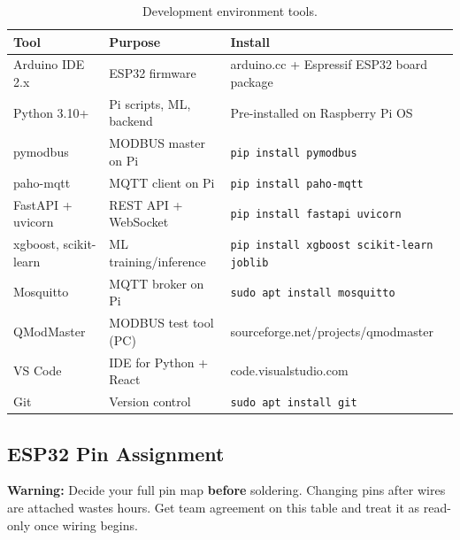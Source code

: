 \documentclass[12pt,a4paper]{article}
\newenvironment{warnbox}{%
  \begin{mdframed}[backgroundcolor=warnbg,linecolor=warnln,linewidth=1.5pt,
    innerleftmargin=9pt,innerrightmargin=9pt,innertopmargin=5pt,innerbottommargin=5pt]
  \textbf{\color{warnln}Warning: }}{\end{mdframed}}
\begin{document}
\begin{table}[H]
\centering
\begin{tabularx}{\textwidth}{llX}
\toprule
\textbf{Tool} & \textbf{Purpose} & \textbf{Install} \\
\midrule
Arduino IDE 2.x        & ESP32 firmware          & arduino.cc + Espressif ESP32 board package \\
Python 3.10+           & Pi scripts, ML, backend & Pre-installed on Raspberry Pi OS \\
pymodbus               & MODBUS master on Pi     & \texttt{pip install pymodbus} \\
paho-mqtt              & MQTT client on Pi       & \texttt{pip install paho-mqtt} \\
FastAPI + uvicorn      & REST API + WebSocket    & \texttt{pip install fastapi uvicorn} \\
xgboost, scikit-learn  & ML training/inference   & \texttt{pip install xgboost scikit-learn joblib} \\
Mosquitto              & MQTT broker on Pi       & \texttt{sudo apt install mosquitto} \\
QModMaster             & MODBUS test tool (PC)   & sourceforge.net/projects/qmodmaster \\
VS Code                & IDE for Python + React  & code.visualstudio.com \\
Git                    & Version control         & \texttt{sudo apt install git} \\
\bottomrule
\end{tabularx}
\caption{Development environment tools.}
\end{table}

\subsection{ESP32 Pin Assignment}

\begin{warnbox}
Decide your full pin map \textbf{before} soldering. Changing pins after wires are attached wastes hours.
Get team agreement on this table and treat it as read-only once wiring begins.
\end{warnbox}
\end{document}
